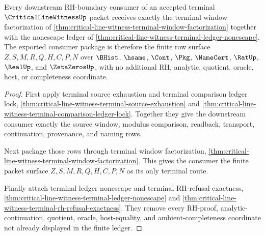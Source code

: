 \begin{theorem}
\label{thm:critical-line-witness-terminal-consumer-exhaustion}
Every downstream RH-boundary consumer of an accepted terminal
$\CriticalLineWitnessUp$ packet receives exactly the terminal window
factorization of \autoref{thm:critical-line-witness-terminal-window-factorization}
together with the nonescape ledger of
\autoref{thm:critical-line-witness-terminal-ledger-nonescape}. The exported
consumer package is therefore the finite row surface $Z,S,M,R,Q,H,C,P,N$ over
$\BHist$, $\hsame$, $\Cont$, $\Pkg$, $\NameCert$, $\RatUp$, $\RealUp$, and
$\ZetaZerosUp$, with no additional RH, analytic, quotient, oracle, host, or
completeness coordinate.
\end{theorem}
\begin{proof}
First apply terminal source exhaustion and terminal comparison ledger lock,
\autoref{thm:critical-line-witness-terminal-source-exhaustion} and
\autoref{thm:critical-line-witness-terminal-comparison-ledger-lock}. Together
they give the downstream consumer exactly the source window, modulus
comparison, readback, transport, continuation, provenance, and naming rows.

Next package those rows through terminal window factorization,
\autoref{thm:critical-line-witness-terminal-window-factorization}. This gives
the consumer the finite packet surface $Z,S,M,R,Q,H,C,P,N$ as its only terminal
route.

Finally attach terminal ledger nonescape and terminal RH-refusal exactness,
\autoref{thm:critical-line-witness-terminal-ledger-nonescape} and
\autoref{thm:critical-line-witness-terminal-rh-refusal-exactness}. They remove
every RH-proof, analytic-continuation, quotient, oracle, host-equality, and
ambient-completeness coordinate not already displayed in the finite ledger.
\end{proof}
